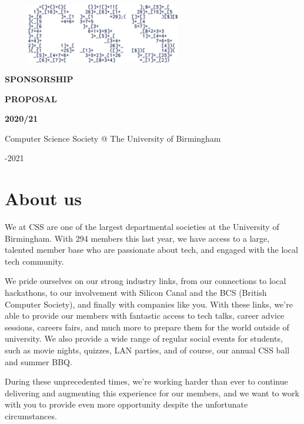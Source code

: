 \documentclass{article}
\begin{document}

\begin{figure}
  \includegraphics[width=0.6\textwidth]{CSS_Logo}
\end{figure}

\vspace*{0.01cm}

\fontsize{56}{50}\selectfont

\noindent\textbf{SPONSORSHIP}
\par
\noindent\textbf{PROPOSAL}
\par
\noindent\textbf{2020/21}

\fontsize{13}{18}\selectfont
\vspace{0.5cm}
\noindent Computer Science Society @ The University of Birmingham \par
{}-2021

\newpage

\section*{About us}

We at CSS are one of the largest departmental societies at the University of Birmingham. With 294 members this last year, we have access to a large, talented member base who are passionate about tech, and engaged with the local tech community.

\vspace{1cm}

We pride ourselves on our strong industry links, from our connections to local hackathons, to our involvement with Silicon Canal and the BCS (British Computer Society), and finally with companies like you.
With these links, we're able to provide our members with fantastic access to tech talks, career advice sessions, careers fairs, and much more to prepare them for the world outside of university.
We also provide a wide range of regular social events for students, such as movie nights, quizzes, LAN parties, and of course, our annual CSS ball and summer BBQ.

\vspace{1cm}

During these unprecedented times, we're working harder than ever to continue delivering and augmenting this experience for our members, and we want to work with you to provide even more opportunity despite the unfortunate circumstances.
\end{document}
